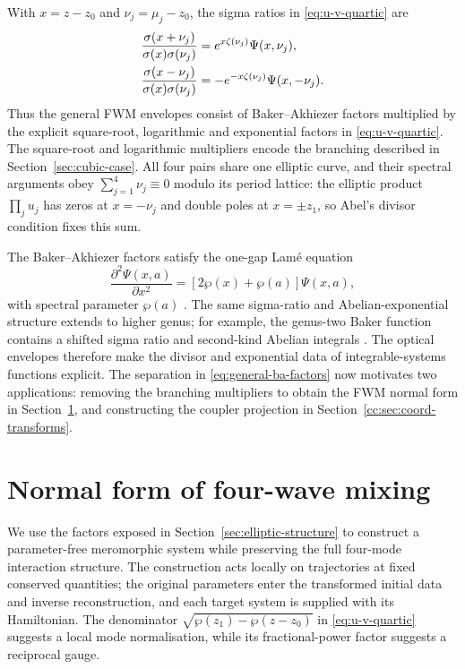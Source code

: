 \documentclass{optica-article}
\numberwithin{equation}{section}
\begin{document}
With $x=z-z_0$ and $\nu_j=\mu_j-z_0$, the sigma ratios in \eqref{eq:u-v-quartic} are
\begin{align}
\frac{\sigma(x+\nu_j)}{\sigma(x)\sigma(\nu_j)}
&=e^{x\zeta(\nu_j)}\Psi(x,\nu_j),\notag\\
\frac{\sigma(x-\nu_j)}{\sigma(x)\sigma(\nu_j)}
&=-e^{-x\zeta(\nu_j)}\Psi(x,-\nu_j).
\label{eq:general-ba-factors}
\end{align}
Thus the general FWM envelopes consist of Baker--Akhiezer factors multiplied by the explicit square-root, logarithmic and exponential factors in \eqref{eq:u-v-quartic}.
The square-root and logarithmic multipliers encode the branching described in Section~\ref{sec:cubic-case}.
All four pairs share one elliptic curve, and their spectral arguments obey $\sum_{j=1}^4\nu_j\equiv0$ modulo its period lattice: the elliptic product $\prod_j u_j$ has zeros at $x=-\nu_j$ and double poles at $x=\pm z_1$, so Abel's divisor condition fixes this sum.

The Baker--Akhiezer factors satisfy the one-gap Lam\'e equation
\begin{equation}
\frac{\partial^2\Psi(x,a)}{\partial x^2}
=[2\wp(x)+\wp(a)]\Psi(x,a),
\label{eq:general-ba-lame}
\end{equation}
with spectral parameter $\wp(a)$ \cite[Eq.~(1.9)]{kricheverEllipticSolutionsNonlinear1994}.
The same sigma-ratio and Abelian-exponential structure extends to higher genus; for example, the genus-two Baker function contains a shifted sigma ratio and second-kind Abelian integrals \cite[Eq.~(3.3)]{bradenBilinearRecurrencesAddition2005}.
The optical envelopes therefore make the divisor and exponential data of integrable-systems functions explicit.
The separation in \eqref{eq:general-ba-factors} now motivates two applications: removing the branching multipliers to obtain the FWM normal form in Section~\ref{sec:coord-transforms}, and constructing the coupler projection in Section~\ref{cc:sec:coord-transforms}.

\section{Normal form of four-wave mixing}\label{sec:coord-transforms}
We use the factors exposed in Section~\ref{sec:elliptic-structure} to construct a parameter-free meromorphic system while preserving the full four-mode interaction structure.
The construction acts locally on trajectories at fixed conserved quantities; the original parameters enter the transformed initial data and inverse reconstruction, and each target system is supplied with its Hamiltonian.
The denominator $\sqrt{\wp(z_1)-\wp(z-z_0)}$ in \eqref{eq:u-v-quartic} suggests a local mode normalisation, while its fractional-power factor suggests a reciprocal gauge.
\end{document}
